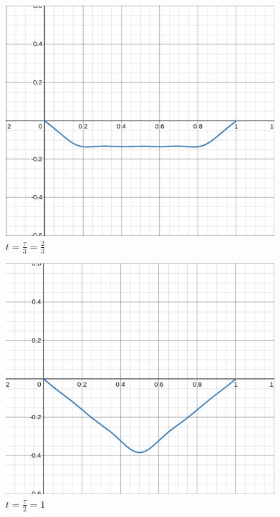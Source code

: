 \documentclass[letter, 10pts]{article}
\begin{document}
\hfill %
\begin{minipage}{0.5\textwidth}
\begin{figure}[H]
	\centering
	\includegraphics[width=0.9\textwidth]{../phys311/ss/c_n_02.png}
	\caption{$t = \frac{\tau}{3} = \frac{2}{3}$}
	\label{fig:ss-c_n_01-png}
\end{figure}
\begin{figure}[H]
	\centering
	\includegraphics[width=0.9\textwidth]{../phys311/ss/c_n_03.png}
	\caption{$t = \frac{\tau}{2} = 1$}
	\label{fig:ss-c_n_01-png}
\end{figure}
\end{minipage}
\newpage
\end{document}
